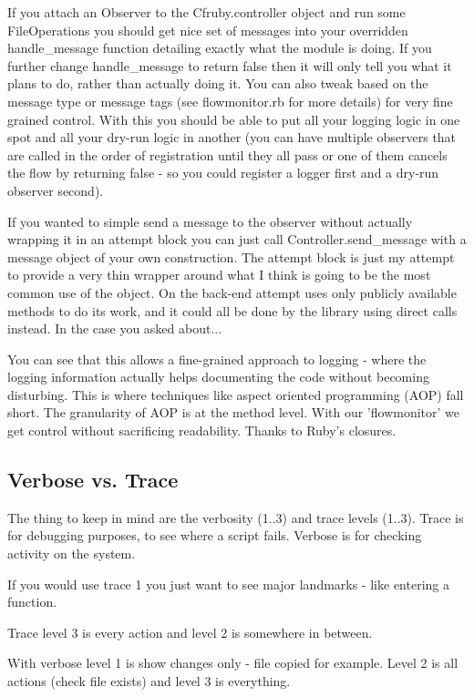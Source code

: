 If you attach an Observer to the Cfruby.controller object and run some
FileOperations you should get nice set of messages into your
overridden handle\_message function detailing exactly what the module
is doing.  If you further change handle\_message to return false then
it will only tell you what it plans to do, rather than actually doing
it.  You can also tweak based on the message type or message tags (see
flowmonitor.rb for more details) for very fine grained control.  With
this you should be able to put all your logging logic in one spot and
all your dry-run logic in another (you can have multiple observers
that are called in the order of registration until they all pass or
one of them cancels the flow by returning false - so you could
register a logger first and a dry-run observer second).

If you wanted to simple send a message to the observer without
actually wrapping it in an attempt block you can just call
Controller.send\_message with a message object of your own
construction.  The attempt block is just my attempt to provide a very
thin wrapper around what I think is going to be the most common use of
the object.  On the back-end attempt uses only publicly available
methods to do its work, and it could all be done by the library using
direct calls instead.  In the case you asked about...

You can see that this allows a fine-grained approach to logging -
where the logging information actually helps documenting the code
without becoming disturbing. This is where techniques like aspect
oriented programming (AOP) fall short. The granularity of AOP is at
the method level. With our 'flowmonitor' we get control without
sacrificing readability. Thanks to Ruby's closures.


\subsection{Verbose vs. Trace}

The thing to keep in mind are the verbosity (1..3) and trace levels
(1..3). Trace is for debugging purposes, to see where a script
fails. Verbose is for checking activity on the system.

If you would use trace 1 you just want to see major landmarks - like
entering a function.

Trace level 3 is every action and level 2 is somewhere in between.

With verbose level 1 is show changes only - file copied for example.
Level 2 is all actions (check file exists) and level 3 is everything.

